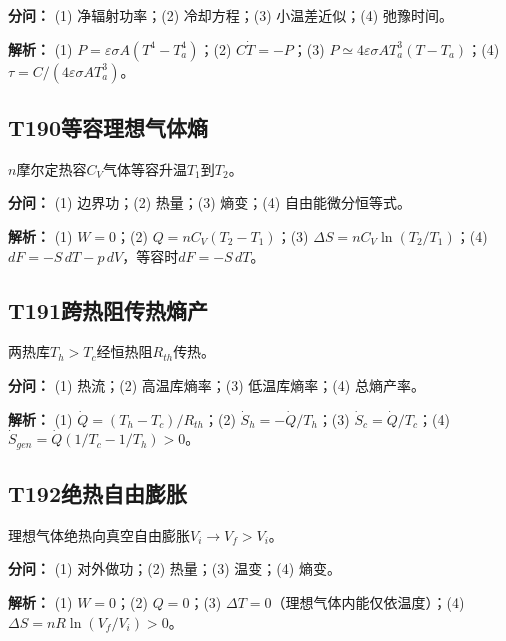 \par\textbf{分问：} (1) 净辐射功率；(2) 冷却方程；(3) 小温差近似；(4) 弛豫时间。

\par\textbf{解析：} (1) $P=\varepsilon\sigma A(T^4-T_a^4)$；(2) $C\dot T=-P$；(3) $P\simeq4\varepsilon\sigma AT_a^3(T-T_a)$；(4) $\tau=C/(4\varepsilon\sigma AT_a^3)$。

\medskip

\subsection*{T190\quad 等容理想气体熵}

$n$摩尔定热容$C_V$气体等容升温$T_1$到$T_2$。

\par\textbf{分问：} (1) 边界功；(2) 热量；(3) 熵变；(4) 自由能微分恒等式。

\par\textbf{解析：} (1) $W=0$；(2) $Q=nC_V(T_2-T_1)$；(3) $\Delta S=nC_V\ln(T_2/T_1)$；(4) $dF=-S\,dT-p\,dV$，等容时$dF=-S\,dT$。

\medskip

\subsection*{T191\quad 跨热阻传热熵产}

两热库$T_h>T_c$经恒热阻$R_{th}$传热。

\par\textbf{分问：} (1) 热流；(2) 高温库熵率；(3) 低温库熵率；(4) 总熵产率。

\par\textbf{解析：} (1) $\dot Q=(T_h-T_c)/R_{th}$；(2) $\dot S_h=-\dot Q/T_h$；(3) $\dot S_c=\dot Q/T_c$；(4) $\dot S_{gen}=\dot Q(1/T_c-1/T_h)>0$。

\medskip

\subsection*{T192\quad 绝热自由膨胀}

理想气体绝热向真空自由膨胀$V_i\to V_f>V_i$。

\par\textbf{分问：} (1) 对外做功；(2) 热量；(3) 温变；(4) 熵变。

\par\textbf{解析：} (1) $W=0$；(2) $Q=0$；(3) $\Delta T=0$（理想气体内能仅依温度）；(4) $\Delta S=nR\ln(V_f/V_i)>0$。

